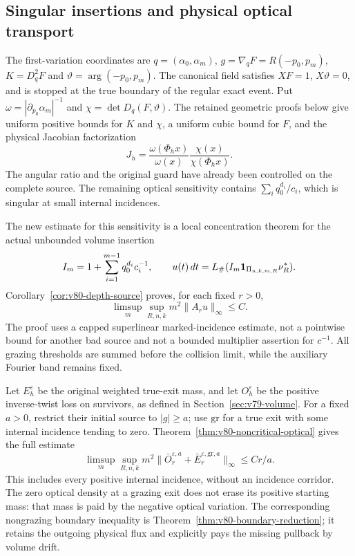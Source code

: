 \documentclass[11pt,reqno]{amsart}
\numberwithin{equation}{section}
\theoremstyle{definition}\newtheorem{definition}[theorem]{Definition}
\theoremstyle{remark}\newtheorem{remark}[theorem]{Remark}
\theoremstyle{definition}\newtheorem{inputstatement}[theorem]{Input statement}
\begin{document}
\subsection{Singular insertions and physical optical transport}
The first-variation coordinates are $q=(\alpha_0,\alpha_m)$,
$g=\nabla_qF=R(-p_0,p_m)$, $K=D_q^2F$ and
$\vartheta=\arg(-p_0,p_m)$. The canonical field satisfies
$XF=1$, $X\vartheta=0$, and is stopped at the true boundary of the
regular exact event. Put
$\omega=|\partial_{p_0}\alpha_m|^{-1}$ and
$\chi=\det D_q(F,\vartheta)$. The retained geometric proofs below
give uniform positive bounds for $K$ and $\chi$, a uniform cubic
bound for $F$, and the physical Jacobian factorization
\[
             J_h=\frac{\omega(\Phi_hx)}{\omega(x)}
                       \frac{\chi(x)}{\chi(\Phi_hx)}.
\]
The angular ratio and the original guard have already been controlled
on the complete source. The remaining optical sensitivity contains
$\sum_i q_0^{d_i}/c_i$, which is singular at small internal incidences.

The new estimate for this sensitivity is a local concentration theorem
for the actual unbounded volume insertion
\[
 I_m=1+\sum_{i=1}^{m-1}q_0^{d_i}c_i^{-1},\qquad
 u(t)\,dt=L_\#(I_m\mathbf1_{\Pi_{n,k,m,R}}\nu_R^*).
\]
Corollary~\ref{cor:v80-depth-source} proves, for each fixed $r>0$,
\[
              \limsup_m\sup_{R,n,k}m^2\|A_r u\|_\infty\le C.
\]
The proof uses a capped superlinear marked-incidence estimate, not a
pointwise bound for another bad source and not a bounded multiplier
assertion for $c^{-1}$. All grazing thresholds are summed before the
collision limit, while the auxiliary Fourier band remains fixed.

Let $E_h^\varepsilon$ be the original weighted true-exit mass, and
let $O_h^\varepsilon$ be the positive inverse-twist loss on survivors,
as defined in Section~\ref{sec:v79-volume}. For a fixed
$a>0$, restrict their initial source to $|g|\ge a$; use $\mathrm{gr}$
for a true exit with some internal incidence tending to zero.
Theorem~\ref{thm:v80-noncritical-optical} gives the full estimate
\[
 \limsup_m\sup_{R,n,k}m^2
       \|\bar O_r^{\varepsilon,a}
           +\bar E_r^{\varepsilon,\mathrm{gr},a}\|_\infty
                  \le Cr/a.
\]
This includes every positive internal incidence, without an incidence
corridor. The zero optical density at a grazing exit does not erase
its positive starting mass: that mass is paid by the negative optical
variation. The corresponding nongrazing boundary inequality is
Theorem~\ref{thm:v80-boundary-reduction}; it retains the outgoing
physical flux and explicitly pays the missing pullback by volume drift.
\end{document}
